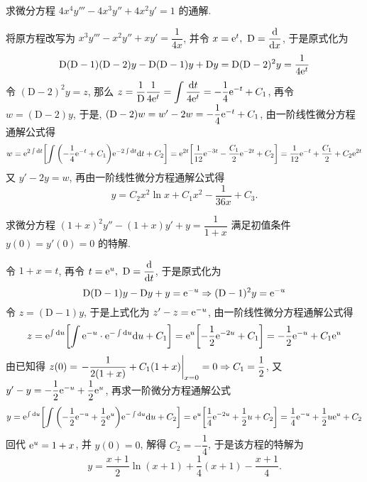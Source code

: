 \begin{example}
    求微分方程 $4x^4y'''-4x^3y''+4x^2y'=1$ 的通解.
\end{example}
\begin{solution}
    将原方程改写为 $x^3y'''-x^2y''+xy'=\dfrac{1}{4x}$, 并令 $x=\mathrm{e} ^t,~\mathrm{D}=\displaystyle\dv{x}$, 于是原式化为
    $$\mathrm{D}(\mathrm{D}-1)(\mathrm{D}-2)y-\mathrm{D}(\mathrm{D}-1)y+\mathrm{D}y=\mathrm{D}(\mathrm{D}-2)^2y=\dfrac{1}{4\mathrm{e} ^t}$$
    令 $(\mathrm{D}-2)^2y=z$, 那么 $z=\dfrac{1}{\mathrm{D}}\dfrac{1}{4\mathrm{e} ^t}=\displaystyle\int\dfrac{\dd t}{4\mathrm{e} ^t}=-\dfrac{1}{4}\mathrm{e} ^{-t}+C_1$, 再令 $w=(\mathrm{D}-2)y$, 于是,
    $(\mathrm{D}-2)w=w'-2w=-\dfrac{1}{4}\mathrm{e} ^{-t}+C_1$, 由一阶线性微分方程通解公式得
    $$w=\mathrm{e} ^{2\int\dd t}\qty[\int\qty(-\dfrac{1}{4}\mathrm{e} ^{-t}+C_1)\mathrm{e} ^{-2\int\dd t}\dd t+C_2]=\mathrm{e} ^{2t}\qty[\dfrac{1}{12}\mathrm{e} ^{-3t}-\dfrac{C_1}{2}\mathrm{e} ^{-2t}+C_2]=\dfrac{1}{12}\mathrm{e} ^{-t}+\dfrac{C_1}{2}+C_2\mathrm{e} ^{2t}$$
    又 $y'-2y=w$, 再由一阶线性微分方程通解公式得
    $$y=C_2x^2\ln x+C_1x^2-\dfrac{1}{36x}+C_3.$$
\end{solution}

\begin{example}
    求微分方程 $(1+x)^2y''-(1+x)y'+y=\dfrac{1}{1+x}$ 满足初值条件 $y(0)=y'(0)=0$ 的特解.
\end{example}
\begin{solution}
    令 $1+x=t$, 再令 $t=\mathrm{e} ^u,~\mathrm{D}=\displaystyle\dv{t}$, 于是原式化为
    $$\mathrm{D}(\mathrm{D}-1)y-\mathrm{D}y+y=\mathrm{e} ^{-u}\Rightarrow (\mathrm{D}-1)^2y=\mathrm{e} ^{-u}$$
    令 $z=(\mathrm{D}-1)y$, 于是上式化为 $z'-z=\mathrm{e} ^{-u}$, 由一阶线性微分方程通解公式得
    $$z=\mathrm{e} ^{\int\dd u}\qty[\int\mathrm{e} ^{-u}\cdot\mathrm{e} ^{-\int\dd u}\dd u+C_1]=\mathrm{e} ^u\qty[-\dfrac{1}{2}\mathrm{e} ^{-2u}+C_1]=-\dfrac{1}{2}\mathrm{e} ^{-u}+C_1\mathrm{e} ^u$$
    由已知得 $z(0)=\eval{-\dfrac{1}{2(1+x)}+C_1(1+x)}_{x=0}=0\Rightarrow C_1=\dfrac{1}{2}$, 又 $y'-y=-\dfrac{1}{2}\mathrm{e} ^{-u}+\dfrac{1}{2}\mathrm{e} ^u$, 再求一阶微分方程通解公式
    $$y=\mathrm{e} ^{\int\dd u}\qty[\int\qty(-\dfrac{1}{2}\mathrm{e} ^{-u}+\dfrac{1}{2}\mathrm{e} ^u)\mathrm{e} ^{-\int\dd u}\dd u+C_2]=\mathrm{e} ^u\qty[\dfrac{1}{4}\mathrm{e} ^{-2u}+\dfrac{1}{2}u+C_2]=\dfrac{1}{4}\mathrm{e} ^{-u}+\dfrac{1}{2}u\mathrm{e} ^u+C_2$$
    回代 $\mathrm{e} ^u=1+x$, 并 $y(0)=0$, 解得 $C_2=-\dfrac{1}{4}$, 于是该方程的特解为 $$y=\dfrac{x+1}{2}\ln(x+1)+\dfrac{1}{4}(x+1)-\dfrac{x+1}{4}.$$
\end{solution}

